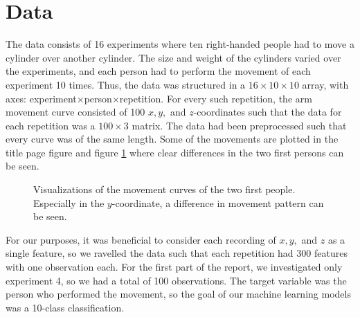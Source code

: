 \documentclass[11pt,fleqn]{article}
\begin{document}
\section{Data}
The data consists of 16 experiments where ten right-handed people had to move a cylinder over another cylinder.
The size and weight of the cylinders varied over the experiments, and each person had to perform the movement of each experiment 10 times.
Thus, the data was structured in a $ 16\times 10\times 10 $ array, with axes: experiment\(\times\)person\(\times\)repetition.
For every such repetition, the arm movement curve consisted of 100 $ x, y, $ and $ z $-coordinates such that the data for each repetition was a $ 100\times 3 $ matrix.
The data had been preprocessed such that every curve was of the same length.
Some of the movements are plotted in the title page figure  and figure \ref{fig:2dtrajects} where clear differences in the two first persons can be seen.


\begin{figure}[H]
	
	\centering
	\caption{Visualizations of the movement curves of the two first people. Especially in the \(y\)-coordinate, a difference in movement pattern can be seen.}
	\label{fig:2dtrajects}
\end{figure}\noindent 
For our purposes, it was beneficial to consider each recording of $ x, y, $ and $ z $ as a single feature, so we ravelled the data such that each repetition had $ 300 $ features with one observation each.
For the first part of the report, we investigated only experiment 4, so we had a total of 100 observations.
The target variable was the person who performed the movement, so the goal of our machine learning models was a 10-class classification.
\end{document}
